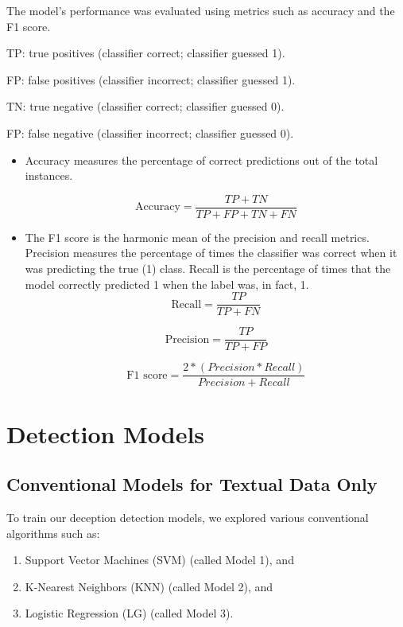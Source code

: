 \documentclass[12pt]{article}
\begin{document}
The model's performance was evaluated using metrics such as accuracy and the F1 score. 
  
TP: true positives (classifier correct; classifier guessed 1).
  
FP: false positives (classifier incorrect; classifier guessed 1).
  
TN: true negative (classifier correct; classifier guessed 0).
  
FP: false negative (classifier incorrect; classifier guessed 0).
\begin{itemize}
\item Accuracy measures the percentage of correct predictions out of the total instances.
  
  \begin{equation} \label{eq:recall}
    \text{Accuracy} =  \frac{TP + TN}{TP + FP + TN + FN}
\end{equation}
\item The F1 score is the harmonic mean of the precision and recall metrics. Precision measures the percentage of times the classifier was correct when it was predicting the true (1) class. Recall is the percentage of times that the model correctly predicted 1 when the label was, in fact, 1.
  \begin{equation} \label{eq:recall}
    \text{Recall} = \frac{TP}{TP + FN} 
\end{equation}

\begin{equation} \label{eq:recall}
    \text{Precision} = \frac{TP}{TP + FP} 
\end{equation}

\begin{equation} \label{eq:recall}
    \text{F1 score} = \frac{2 * (Precision * Recall)}{Precision + Recall}
\end{equation}

\end{itemize}


\section{Detection Models}
\label{sec:models}

\subsection{Conventional Models for Textual Data Only}
To train our deception detection models, we explored various conventional algorithms such as:
\begin{enumerate}
    \item Support Vector Machines (SVM) (called Model 1), and
    \item K-Nearest Neighbors (KNN) (called Model 2), and
    \item Logistic Regression (LG) (called Model 3).
    \end{enumerate}
\end{document}
